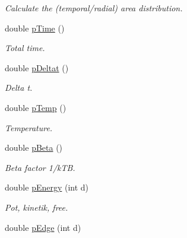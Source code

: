 \begin{DoxyCompactItemize}
\begin{DoxyCompactList}\small\item\em Calculate the (temporal/radial) area distribution. \end{DoxyCompactList}\item 
double \hyperlink{classVarData_ad5bf6099846e677cae330617688069c8}{p\+Time} ()\hypertarget{classVarData_ad5bf6099846e677cae330617688069c8}{}\label{classVarData_ad5bf6099846e677cae330617688069c8}

\begin{DoxyCompactList}\small\item\em Total time. \end{DoxyCompactList}\item 
double \hyperlink{classVarData_af6622c9e9e57aae3faf756b7faa73e29}{p\+Deltat} ()\hypertarget{classVarData_af6622c9e9e57aae3faf756b7faa73e29}{}\label{classVarData_af6622c9e9e57aae3faf756b7faa73e29}

\begin{DoxyCompactList}\small\item\em Delta t. \end{DoxyCompactList}\item 
double \hyperlink{classVarData_a495c5b182109864eb1db337d49a53999}{p\+Temp} ()\hypertarget{classVarData_a495c5b182109864eb1db337d49a53999}{}\label{classVarData_a495c5b182109864eb1db337d49a53999}

\begin{DoxyCompactList}\small\item\em Temperature. \end{DoxyCompactList}\item 
double \hyperlink{classVarData_af1623f8a2959ef8023d9855a7b2be946}{p\+Beta} ()\hypertarget{classVarData_af1623f8a2959ef8023d9855a7b2be946}{}\label{classVarData_af1623f8a2959ef8023d9855a7b2be946}

\begin{DoxyCompactList}\small\item\em Beta factor 1/k\+TB. \end{DoxyCompactList}\item 
double \hyperlink{classVarData_a2f2b71871885d7b957cd46bff88cc637}{p\+Energy} (int d)\hypertarget{classVarData_a2f2b71871885d7b957cd46bff88cc637}{}\label{classVarData_a2f2b71871885d7b957cd46bff88cc637}

\begin{DoxyCompactList}\small\item\em Pot, kinetik, free. \end{DoxyCompactList}\item 
double \hyperlink{classVarData_ab1955d8a8a364358ea5cb9b22419941d}{p\+Edge} (int d)\hypertarget{classVarData_ab1955d8a8a364358ea5cb9b22419941d}{}\label{classVarData_ab1955d8a8a364358ea5cb9b22419941d}


\end{DoxyCompactItemize}

